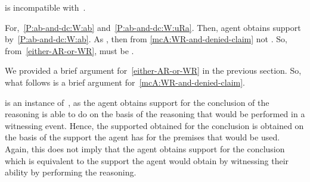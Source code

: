 \begin{note}[Proposition]
   \begin{proposition}\label{mcA:WR-and-denied-claim}
    \WR{} is incompatible with~\uRa{}.
  \end{proposition}
    For,~\ref{P:ab-and-dc:W:ab} and~\ref{P:ab-and-dc:W:uRa}.
  Then, agent obtains support by~\ref{P:ab-and-dc:W:ab}.
  As \uRa{}, then from \ref{mcA:WR-and-denied-claim} not \WR{}.
  So, from~\ref{either-AR-or-WR}, must be \AR{}.
\end{note}

\begin{note}[To argument]
  {
    \color{red}
    We provided a brief argument for~\ref{either-AR-or-WR} in the previous section.
  }
  So, what follows is a brief argument for~\ref{mcA:WR-and-denied-claim}.
\end{note}

\begin{note}[Attribute]
  \WR{} is an instance of~\rC{}, as the agent obtains support for the conclusion of the reasoning is able to do on the basis of the reasoning that would be performed in a witnessing event.
  Hence, the supported obtained for the conclusion is obtained on the basis of the support the agent has for the premises that would be used.
  Again, this does not imply that the agent obtains support for the conclusion which is equivalent to the support the agent would obtain by witnessing their ability by performing the reasoning.
\end{note}


